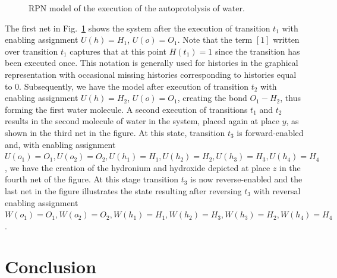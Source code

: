 \documentclass[runningheads]{llncs}
\begin{document}
\begin{figure}
	\caption{RPN model of the execution of the autoprotolysis of water.}
	\label{execution}
\end{figure}

The first net in Fig.~\ref{execution}  shows the system after the execution of transition $t_1$ with enabling assignment $U(h)=H_1$, $U(o)=O_1$. Note
that the term $[1]$ written over transition $t_1$ captures that at this point $H(t_1)=1$ 
since the transition has been executed once.
This notation is generally used for histories in the graphical representation with occasional
missing histories corresponding to histories equal to $0$.
Subsequently,
we have the model after execution of transition $t_2$ with enabling assignment $U(h)=H_2$,
$U(o)=O_1$, creating the bond $O_1-H_2$, thus forming the first water molecule. A second
execution of transitions $t_1$ and $t_2$ results in the second molecule of water in the system,
placed again at place $y$, as shown in the third net in the figure. At this state, transition
$t_3$ is forward-enabled and,  with enabling assignment $U(o_1)=O_1, U(o_2)=O_2, U(h_1)=H_1, 
U(h_2)=H_2,U(h_3)=H_3,U(h_4)=H_4$, we have the creation of the hydronium and hydroxide
depicted at place $z$ in the fourth net of the figure. At this stage  transition $t_3$ is
now reverse-enabled and the last net in the figure illustrates the state resulting after
reversing $t_3$ with reversal enabling assignment $W(o_1)=O_1, W(o_2)=O_2, W(h_1)=H_1, 
W(h_2)=H_3,W(h_3)=H_2,W(h_4)=H_4$.


\section{Conclusion}
\end{document}
